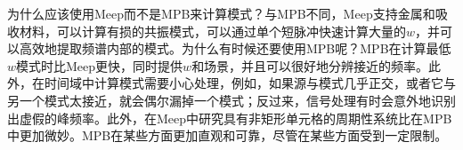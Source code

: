 \documentclass{article}
\numberwithin{equation}{section}
\begin{document}
为什么应该使用Meep而不是MPB来计算模式？与MPB不同，Meep支持金属和吸收材料，可以计算有损的共振模式，可以通过单个短脉冲快速计算大量的$w$，并可以高效地提取频谱内部的模式。为什么有时候还要使用MPB呢？MPB在计算最低$w$模式时比Meep更快，同时提供$w$和场景，并且可以很好地分辨接近的频率。此外，在时间域中计算模式需要小心处理，例如，如果源与模式几乎正交，或者它与另一个模式太接近，就会偶尔漏掉一个模式；反过来，信号处理有时会意外地识别出虚假的峰频率。此外，在Meep中研究具有非矩形单元格的周期性系统比在MPB中更加微妙。MPB在某些方面更加直观和可靠，尽管在某些方面受到一定限制。































\newpage















\end{document}
